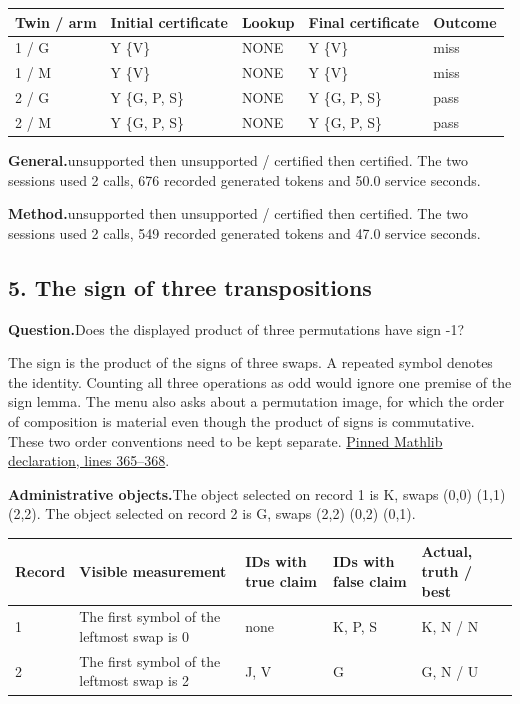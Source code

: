 \documentclass[12pt,letterpaper]{article}
\newcommand{\dossier}[2]{\clearpage\subsection*{#1}\phantomsection\label{#2}}
\newcommand{\reading}[2]{\par\smallskip\textsf{\color{accent}\bfseries #1}\enspace #2\par}
\begin{document}
\begin{center}\footnotesize\setlength{\tabcolsep}{4pt}\begin{tabularx}{\linewidth}{lYlYl}\toprule
Twin / arm & Initial certificate & Lookup & Final certificate & Outcome\\ / G & Y \{V\} & NONE & Y \{V\} & miss\\
1 / M & Y \{V\} & NONE & Y \{V\} & miss\\
2 / G & Y \{G, P, S\} & NONE & Y \{G, P, S\} & pass\\
2 / M & Y \{G, P, S\} & NONE & Y \{G, P, S\} & pass\\
\bottomrule\end{tabularx}\end{center}


\reading{General.}{unsupported then unsupported / certified then certified. The two sessions used 2 calls, 676 recorded generated tokens and 50.0 service seconds.}

\reading{Method.}{unsupported then unsupported / certified then certified. The two sessions used 2 calls, 549 recorded generated tokens and 47.0 service seconds.}

\dossier{5. The sign of three transpositions}{case5}

\reading{Question.}{Does the displayed product of three permutations have sign -1?}

The sign is the product of the signs of three swaps. A repeated symbol denotes the identity. Counting all three operations as odd would ignore one premise of the sign lemma. The menu also asks about a permutation image, for which the order of composition is material even though the product of signs is commutative. These two order conventions need to be kept separate. \href{https://github.com/leanprover-community/mathlib4/blob/0df444a360eaa60ab8c11dca51a86af692955474/Mathlib/GroupTheory/Perm/Sign.lean#L365-L368}{Pinned Mathlib declaration, lines 365--368}.

\reading{Administrative objects.}{The object selected on record 1 is K, swaps (0,0) (1,1) (2,2). The object selected on record 2 is G, swaps (2,2) (0,2) (0,1).}

\begin{center}\footnotesize\setlength{\tabcolsep}{4pt}\begin{tabularx}{\linewidth}{lYYYl}\toprule
Record & Visible measurement & IDs with true claim & IDs with false claim & Actual, truth / best\\ & The first symbol of the leftmost swap is 0 & none & K, P, S & K, N / N\\
2 & The first symbol of the leftmost swap is 2 & J, V & G & G, N / U\\
\bottomrule\end{tabularx}\end{center}
\end{document}
